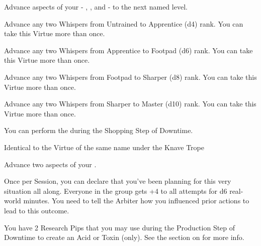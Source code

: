 \begin{multicols*}{2}

Advance  aspects of your  - \DEATH, \INJURY, and \INSANITY - to the next named level. 


Advance any two Whispers from Untrained to Apprentice (d4) rank. You can take this Virtue more than once.


Advance any two Whispers from Apprentice to Footpad (d6) rank. You can take this Virtue more than once.


Advance any two Whispers from Footpad to Sharper (d8) rank. You can take this Virtue more than once.


Advance any two Whispers from Sharper to Master (d10) rank. You can take this Virtue more than once.


You can perform the  during the Shopping Step of Downtime. 


Identical to the Virtue of the same name under the Knave Trope



Advance two  aspects of your  \DCUP.


Once per Session, you can declare that you’ve been planning for this very situation all along. Everyone in the group gets +4 to all \RO attempts for d6 real-world minutes.  You need to tell the Arbiter how you influenced prior actions to lead to this outcome. 


You have 2 Research Pips that you may use during the Production Step of Downtime to create an Acid or Toxin (only). See the section on  for more info.


\end{multicols*}
